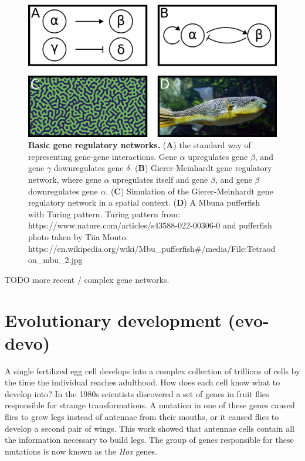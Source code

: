 \begin{figure}[H]
    \includegraphics[width=\linewidth]{ch.introduction/imgs/network.png}
    \caption{\textbf{Basic gene regulatory networks.} (\textbf{A}) the standard way of representing gene-gene interactions. Gene $\alpha$ upregulates gene $\beta$, and gene $\gamma$ downregulates gene $\delta$. (\textbf{B}) Gierer-Meinhardt gene regulatory network, where gene $\alpha$ upregulates itself and gene $\beta$, and gene $\beta$ downregulates gene $\alpha$. (\textbf{C}) Simulation of the Gierer-Meinhardt gene regulatory network in a spatial context. (\textbf{D}) A Mbuna pufferfish with Turing pattern. Turing pattern from: https://www.nature.com/articles/s43588-022-00306-0 and pufferfish photo taken by Tiia Monto: https://en.wikipedia.org/wiki/Mbu\_pufferfish\#/media/File:Tetraodon\_mbu\_2.jpg}
    \label{fig:network}
\end{figure}

TODO more recent / complex gene networks. 

\section{Evolutionary development (evo-devo)}

A single fertilized egg cell develops into a complex collection of trillions of cells by the time the individual reaches adulthood. How does each cell know what to develop into? In the 1980s scientists discovered a set of genes in fruit flies responsible for strange transformations. A mutation in one of these genes caused flies to grow legs instead of antennae from their mouths\cite{Schneuwly1987}, or it caused flies to develop a second pair of wings\cite{Weatherbee1998}. This work showed that antennae cells contain all the information necessary to build legs. The group of genes responsible for these mutations is now known as the \textit{Hox} genes.

